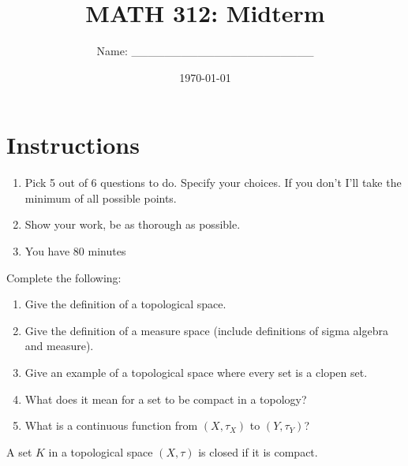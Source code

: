 \documentclass[12pt]{amsart}
\title{ MATH 312: Midterm }
\author{Name: \_\_\_\_\_\_\_\_\_\_\_\_\_\_\_\_\_\_\_\_\_\_}
\date{\today}
\begin{document}
\maketitle


\section*{Instructions}

\begin{enumerate}
	\item Pick 5 out of 6 questions to do. Specify your choices. If you don't I'll take the minimum of all possible points.
	\item Show your work, be as thorough as possible.
	\item You have 80 minutes
\end{enumerate}


\newpage

\begin{question} Complete the following:
	\begin{enumerate}
		\item Give the definition of a topological space.
		      \vspace{7cm}

		\item Give the definition of a measure space (include definitions of sigma algebra and measure).

		      \vspace{7cm}
		\item Give an example of a topological space where every set is a clopen set.

		      \vspace{7cm}
		\item What does it mean for a set to be compact in a topology?

		      \vspace{7cm}
		\item What is a continuous function from $(X, \tau_X)$ to $(Y, \tau_Y)$?
		      \vspace{7cm}
	\end{enumerate}
\end{question}

\newpage

\begin{question}
	A set $K$ in a topological space $(X, \tau)$ is closed if it is compact.

\end{question}
\newpage
\end{document}

